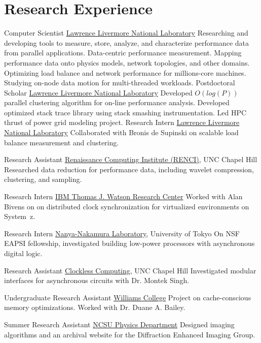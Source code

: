 \section{Research Experience}
		{Computer Scientist}
		{\href{http://www.llnl.gov}{Lawrence Livermore National Laboratory}}{}{}
		{Researching and developing tools to measure, store, analyze, and
		 characterize performance data from parallel applications.
		 Data-centric performance measurement.  Mapping performance data onto
		 physics models, network topologies, and other domains.  Optimizing
		 load balance and network performance for millions-core machines.
		 Studying on-node data motion for multi-threaded workloads.
	}
		{Postdoctoral Scholar}
		{\href{http://www.llnl.gov}{Lawrence Livermore National Laboratory}}{}{}
		{Developed $O(log(P))$ parallel clustering algorithm for on-line performance analysis.
		 Developed optimized stack trace library using stack smashing instrumentation.  
		 Led HPC thrust of power grid modeling project.
		 }
		{Research Intern}
		{\href{http://www.llnl.gov}{Lawrence Livermore National Laboratory}}{}{}
		{Collaborated with Bronis de Supinski on scalable load balance measurement and clustering.}

		{Research Assistant}
		{\href{http://www.renci.org}{Renaissance Computing Institute (RENCI)}, UNC Chapel Hill}{}{}
		{Researched data reduction for performance data, including wavelet compression, clustering,
		 and sampling.}

		{Research Intern}
		{\href{http://www.watson.ibm.com}{IBM Thomas J. Watson Research Center}}{}{}
		{Worked with Alan Bivens on on distributed clock synchronization for virtualized
		 environments on System~z.}

		{Research Intern}
		{\href{http://www.hal.rcast.u-tokyo.ac.jp/}{Nanya-Nakamura Laboratory}, University of Tokyo}{}{}
		{On NSF EAPSI fellowship, investigated building low-power processors with asynchronous digital logic.}

		{Research Assistant}
		{\href{http://www.cs.unc.edu/~montek/}{Clockless Computing}, UNC Chapel Hill}{}{}
		{Investigated modular interfaces for asynchronous circuits with Dr. Montek Singh.}

		{Undergraduate Research Assistant}
		{\href{http://www.williams.edu}{Williams College}}{}{}
		{Project on cache-conscious memory optimizations.  Worked with Dr. Duane A. Bailey.}

		{Summer Research Assistant}
		{\href{http://physics.ncsu.edu/}{NCSU Physics Department}}{}{}
		{Designed imaging algorithms and an archival website for the Diffraction Enhanced Imaging Group.}
